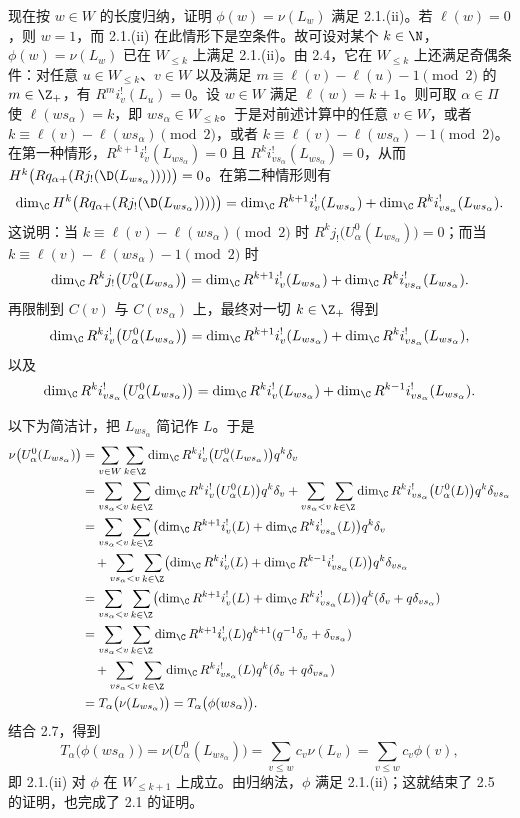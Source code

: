 现在按 $w\in W$ 的长度归纳，证明 $\phi(w)=\nu(L_w)$ 满足 2.1.(ii)。若 $\ell(w)=0$，则 $w=1$，而 2.1.(ii) 在此情形下是空条件。故可设对某个 $k\in\N$，$\phi(w)=\nu(L_w)$ 已在 $W_{\leq k}$ 上满足 2.1.(ii)。由 2.4，它在 $W_{\leq k}$ 上还满足奇偶条件：对任意 $u\in W_{\leq k}$、$v\in W$ 以及满足 $m\equiv\ell(v)-\ell(u)-1\pmod 2$ 的 $m\in\Z_+$，有 $R^mi^!_v(L_u)=0$。设 $w\in W$ 满足 $\ell(w)=k+1$。则可取 $\alpha\in\Pi$ 使 $\ell(ws_\alpha)=k$，即 $ws_\alpha\in W_{\leq k}$。于是对前述计算中的任意 $v\in W$，或者 $k\equiv\ell(v)-\ell(ws_\alpha)\pmod 2$，或者 $k\equiv\ell(v)-\ell(ws_\alpha)-1\pmod 2$。在第一种情形，$R^{k+1}i^!_v(L_{ws_\alpha})=0$ 且 $R^ki^!_{vs_\alpha}(L_{ws_\alpha})=0$，从而 $H^k\bigl(Rq_{\alpha+}(Rj_!(\D(L_{ws_\alpha}))))\bigr)=0$。在第二种情形则有
$$\dim_\C H^k\bigl(Rq_{\alpha+}(Rj_!(\D(L_{ws_\alpha}))))\bigr)
=\dim_\C R^{k+1}i^!_v(L_{ws_\alpha})+\dim_\C R^ki^!_{vs_\alpha}(L_{ws_\alpha}).$$
这说明：当 $k\equiv\ell(v)-\ell(ws_\alpha)\pmod 2$ 时 $R^kj_!\bigl(U^0_\alpha(L_{ws_\alpha})\bigr)=0$；而当 $k\equiv\ell(v)-\ell(ws_\alpha)-1\pmod 2$ 时
$$\dim_\C R^kj_!\bigl(U^0_\alpha(L_{ws_\alpha})\bigr)
=\dim_\C R^{k+1}i^!_v(L_{ws_\alpha})+\dim_\C R^ki^!_{vs_\alpha}(L_{ws_\alpha}).$$
再限制到 $C(v)$ 与 $C(vs_\alpha)$ 上，最终对一切 $k\in\Z_+$ 得到
$$\dim_\C R^ki^!_v\bigl(U^0_\alpha(L_{ws_\alpha})\bigr)
=\dim_\C R^{k+1}i^!_v(L_{ws_\alpha})+\dim_\C R^ki^!_{vs_\alpha}(L_{ws_\alpha}),$$
以及
$$\dim_\C R^ki^!_{vs_\alpha}\bigl(U^0_\alpha(L_{ws_\alpha})\bigr)
=\dim_\C R^ki^!_v(L_{ws_\alpha})+\dim_\C R^{k-1}i^!_{vs_\alpha}(L_{ws_\alpha}).$$

以下为简洁计，把 $L_{ws_\alpha}$ 简记作 $L$。于是
{\small
\begin{align*}
\nu\bigl(U^0_\alpha(L_{ws_\alpha})\bigr)
&=\sum_{v\in W}\sum_{k\in\Z}\dim_\C R^ki^!_v\bigl(U^0_\alpha(L_{ws_\alpha})\bigr)q^k\delta_v\\
&=\sum_{vs_\alpha<v}\sum_{k\in\Z}\dim_\C R^ki^!_v\bigl(U^0_\alpha(L)\bigr)q^k\delta_v
+\sum_{vs_\alpha<v}\sum_{k\in\Z}\dim_\C R^ki^!_{vs_\alpha}\bigl(U^0_\alpha(L)\bigr)q^k\delta_{vs_\alpha}\\
&=\sum_{vs_\alpha<v}\sum_{k\in\Z}\bigl(\dim_\C R^{k+1}i^!_v(L)+\dim_\C R^ki^!_{vs_\alpha}(L)\bigr)q^k\delta_v\\
&\quad+\sum_{vs_\alpha<v}\sum_{k\in\Z}\bigl(\dim_\C R^ki^!_v(L)+\dim_\C R^{k-1}i^!_{vs_\alpha}(L)\bigr)q^k\delta_{vs_\alpha}\\
&=\sum_{vs_\alpha<v}\sum_{k\in\Z}\bigl(\dim_\C R^{k+1}i^!_v(L)+\dim_\C R^ki^!_{vs_\alpha}(L)\bigr)q^k(\delta_v+q\delta_{vs_\alpha})\\
&=\sum_{vs_\alpha<v}\sum_{k\in\Z}\dim_\C R^{k+1}i^!_v(L)q^{k+1}(q^{-1}\delta_v+\delta_{vs_\alpha})\\
&\quad+\sum_{vs_\alpha<v}\sum_{k\in\Z}\dim_\C R^ki^!_{vs_\alpha}(L)q^k(\delta_v+q\delta_{vs_\alpha})\\
&=T_\alpha\bigl(\nu(L_{ws_\alpha})\bigr)=T_\alpha\bigl(\phi(ws_\alpha)\bigr).
\end{align*}
}
结合 2.7，得到
$$T_\alpha\bigl(\phi(ws_\alpha)\bigr)=\nu\bigl(U^0_\alpha(L_{ws_\alpha})\bigr)
=\sum_{v\leq w}c_v\nu(L_v)=\sum_{v\leq w}c_v\phi(v),$$
即 2.1.(ii) 对 $\phi$ 在 $W_{\leq k+1}$ 上成立。由归纳法，$\phi$ 满足 2.1.(ii)；这就结束了 2.5 的证明，也完成了 2.1 的证明。

